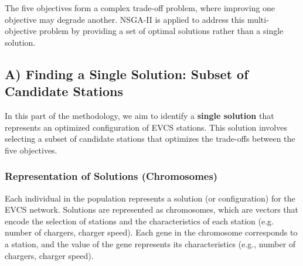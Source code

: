 The five objectives form a complex trade-off problem, where improving one objective may degrade another. NSGA-II is applied to address this multi-objective problem by providing a set of optimal solutions rather than a single solution.

\subsection{A) Finding a Single Solution: Subset of Candidate Stations}

In this part of the methodology, we aim to identify a \textbf{single solution} that represents an optimized configuration of EVCS stations. This solution involves selecting a subset of candidate stations that optimizes the trade-offs between the five objectives.

\subsubsection{Representation of Solutions (Chromosomes)}
Each individual in the population represents a solution (or configuration) for the EVCS network. Solutions are represented as chromosomes, which are vectors that encode the selection of stations and the characteristics of each station (e.g. number of chargers, charger speed). Each gene in the chromosome corresponds to a station, and the value of the gene represents its characteristics (e.g., number of chargers, charger speed).


